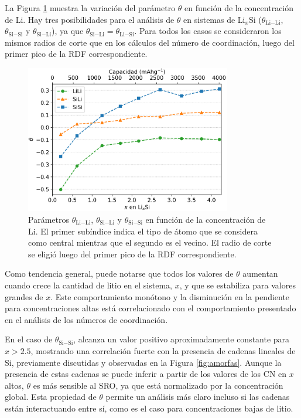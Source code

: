 La Figura \ref{fig:sro} muestra la variación del parámetro $\theta$ en función 
de la concentración de Li. Hay tres posibilidades para el análisis de $\theta$ en
sistemas de Li$_x$Si ($\theta_{\text{Li}-\text{Li}}$, $\theta_{\text{Si}-\text{Si}}$ y $\theta_{\text{Si}-\text{Li}}$), ya
que $\theta_{\text{Si}-\text{Li}} = \theta_{\text{Li}-\text{Si}}$. Para todos los casos se consideraron los
mismos radios de corte que en los cálculos del número de coordinación, luego del
primer pico de la RDF correspondiente.
\begin{figure}[h]
    \centering
    \includegraphics[width=0.8\textwidth]{Silicio/caracterizacion/resultados/sro/sro.png}
    \caption{Parámetros $\theta_{\text{Li}-\text{Li}}$, $\theta_{\text{Si}-\text{Li}}$ y $\theta_{\text{Si}-\text{Si}}$ 
    en función de la concentración de Li. El primer subíndice indica el tipo de
    átomo que se considera como central mientras que el segundo es el vecino. El
    radio de corte se eligió luego del primer pico de la RDF correspondiente.}
    \label{fig:sro}
\end{figure}

Como tendencia general, puede notarse que todos los valores de $\theta$ aumentan
cuando crece la cantidad de litio en el sistema, $x$, y que se estabiliza para 
valores grandes de $x$. Este comportamiento monótono y la disminución en la 
pendiente para concentraciones altas está correlacionado con el comportamiento
presentado en el análisis de los números de coordinación.

En el caso de $\theta_{\text{Si}-\text{Si}}$, alcanza un valor positivo aproximadamente 
constante para $x > 2.5$, mostrando una correlación fuerte con la presencia de 
cadenas lineales de Si, previamente discutidas y observadas en la Figura 
\ref{fig:amorfas}. Aunque la presencia de estas cadenas se puede inferir a partir
de los valores de los CN en $x$ altos, $\theta$ es más sensible al SRO, ya que
está normalizado por la concentración global. Esta propiedad de $\theta$ permite
un análisis más claro incluso si las cadenas están interactuando entre sí, como
es el caso para concentraciones bajas de litio.

